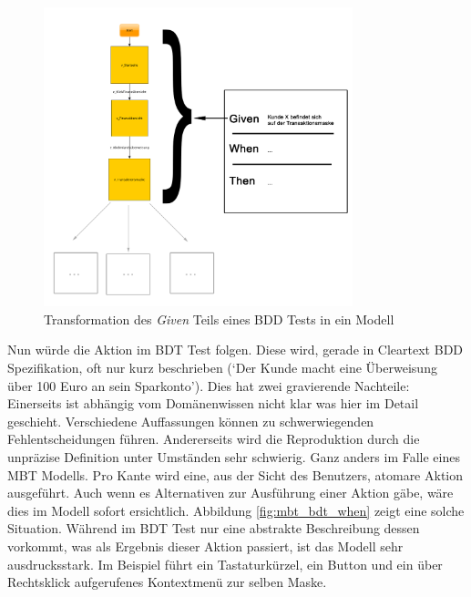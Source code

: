 \begin{figure} 
  \centering
     \includegraphics[width=0.8\textwidth]{figures/mbt_bdt_given.png}
  \caption{Transformation des \textit{Given} Teils eines BDD Tests in ein Modell}
  \label{fig:mbt_bdt_given}
\end{figure}

Nun würde die Aktion im \Gls{BDT} Test folgen. Diese wird, gerade in Cleartext \Gls{BDD} Spezifikation, oft nur kurz beschrieben (`Der Kunde macht eine Überweisung über 100 Euro an sein Sparkonto'). Dies hat zwei gravierende Nachteile: Einerseits ist abhängig vom Domänenwissen nicht klar was hier im Detail geschieht. Verschiedene Auffassungen können zu schwerwiegenden Fehlentscheidungen führen. Andererseits wird die Reproduktion durch die unpräzise Definition unter Umständen sehr schwierig. Ganz anders im Falle eines \Gls{MBT} Modells. Pro Kante wird eine, aus der Sicht des Benutzers, atomare Aktion ausgeführt. Auch wenn es Alternativen zur Ausführung einer Aktion gäbe, wäre dies im Modell sofort ersichtlich. Abbildung \ref{fig:mbt_bdt_when} zeigt eine solche Situation. Während im \Gls{BDT} Test nur eine abstrakte Beschreibung dessen vorkommt, was als Ergebnis dieser Aktion passiert, ist das Modell sehr ausdrucksstark. Im Beispiel führt ein Tastaturkürzel, ein Button und ein über Rechtsklick aufgerufenes Kontextmenü zur selben Maske.

